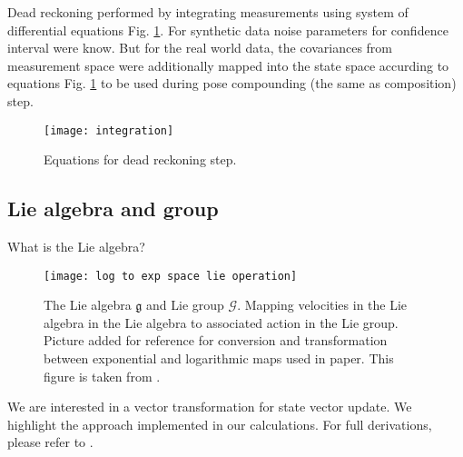 \documentclass{article}
\begin{document}
Dead reckoning performed by integrating measurements using system of differential equations Fig. \ref{fig:dead}. For synthetic data noise parameters for confidence interval were know. But for the real world data, the covariances from measurement space were additionally mapped into the state space accurding to equations Fig. \ref{fig:dead} to be used during pose compounding (the same as composition) step.

\begin{figure}
	\centering
	\texttt{[image: integration]}
	\caption{Equations for dead reckoning step.}
	\label{fig:dead}
\end{figure}




\subsection{Lie algebra and group}

What is the Lie algebra?

\begin{figure}
	\texttt{[image: log to exp space lie operation]}
	
	\caption{The Lie algebra $\mathfrak{g}$ and Lie group $\mathcal{G}$. Mapping velocities in the Lie algebra in the Lie algebra to associated action in the Lie group. Picture added for reference for conversion and transformation between exponential and logarithmic maps used in paper. This figure is taken from \cite{Mangelson}.}
	\label{fig:Lie-transform}
\end{figure}

We are interested in a vector transformation for state vector update.
We highlight the approach implemented in our calculations. For full derivations, please refer to \cite{Barfoot, Mangelson}.
\end{document}
